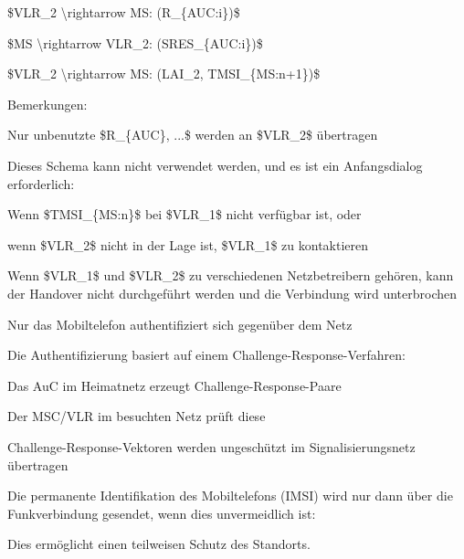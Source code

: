 \documentclass[a4paper]{article}
\begin{document}
\begin{multicols}{3}
\begin{itemize*}
\begin{enumerate*}
                  \item \$VLR\_2 \textbackslash rightarrow MS: (R\_\{AUC:i\})\$
                  \item \$MS \textbackslash rightarrow VLR\_2: (SRES\_\{AUC:i\})\$
                  \item \$VLR\_2 \textbackslash rightarrow MS: (LAI\_2, TMSI\_\{MS:n+1\})\$
            \end{enumerate*}
            \item Bemerkungen:
            \begin{itemize*}
                  \item Nur unbenutzte \$R\_\{AUC\}, ...\$ werden an \$VLR\_2\$ übertragen
                  \item Dieses Schema kann nicht verwendet werden, und es ist ein Anfangsdialog erforderlich:
                  \begin{itemize*}
                        \item Wenn \$TMSI\_\{MS:n\}\$ bei \$VLR\_1\$ nicht verfügbar ist, oder
                        \item wenn \$VLR\_2\$ nicht in der Lage ist, \$VLR\_1\$ zu kontaktieren
                  \end{itemize*}
                  \item Wenn \$VLR\_1\$ und \$VLR\_2\$ zu verschiedenen Netzbetreibern gehören, kann der Handover nicht durchgeführt werden und die Verbindung wird unterbrochen
            \end{itemize*}
            \item Nur das Mobiltelefon authentifiziert sich gegenüber dem Netz
            \item Die Authentifizierung basiert auf einem Challenge-Response-Verfahren:
            \begin{itemize*}
                  \item Das AuC im Heimatnetz erzeugt Challenge-Response-Paare
                  \item Der MSC/VLR im besuchten Netz prüft diese
                  \item Challenge-Response-Vektoren werden ungeschützt im Signalisierungsnetz übertragen
            \end{itemize*}
            \item Die permanente Identifikation des Mobiltelefons (IMSI) wird nur dann über die Funkverbindung gesendet, wenn dies unvermeidlich ist:
            \begin{itemize*}
                  \item Dies ermöglicht einen teilweisen Schutz des Standorts.

\end{itemize*}
\end{itemize*}
\end{multicols}
\end{document}

